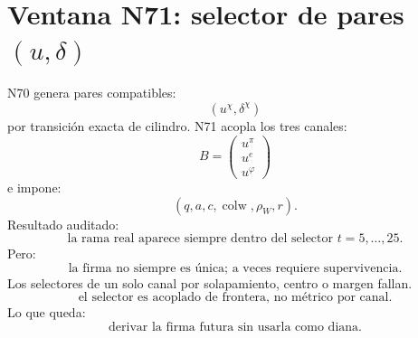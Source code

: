 
\section*{Ventana N71: selector de pares \((u,\delta)\)}
N70 genera pares compatibles:
\[
(u^\chi,\delta^\chi)
\]
por transición exacta de cilindro.
N71 acopla los tres canales:
\[
B=
\begin{pmatrix}
u^\pi\\u^e\\u^\varphi
\end{pmatrix}
\]
e impone:
\[
(q,a,c,\operatorname{colw},\rho_W,r).
\]
Resultado auditado:
\[
\boxed{
\text{la rama real aparece siempre dentro del selector }t=5,\ldots,25.
}
\]
Pero:
\[
\boxed{
\text{la firma no siempre es única; a veces requiere supervivencia.}
}
\]
Los selectores de un solo canal por solapamiento, centro o margen fallan.
\[
\boxed{
\text{el selector es acoplado de frontera, no métrico por canal.}
}
\]
Lo que queda:
\[
\boxed{
\text{derivar la firma futura sin usarla como diana.}
}
\]
